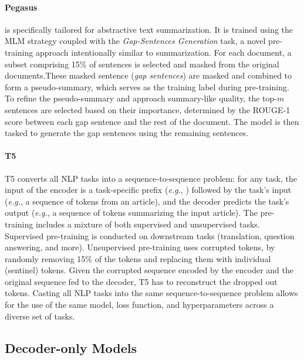 \paragraph{Pegasus} \citep{zhang2020pegasus} is specifically tailored for abstractive text summarization. It is trained using the \ac{MLM} strategy coupled with the \textit{Gap-Sentences Generation} task, a novel pre-training approach intentionally similar to summarization. For each document, a subset comprising 15\% of sentences is selected and masked from the original documents.These masked sentence (\textit{gap sentences}) are masked and combined to form a pseudo-summary, which serves as the training label during pre-training. To refine the pseudo-summary and approach summary-like quality, the top-$m$ sentences are selected based on their importance, determined by the \ac{ROUGE}-1 score between each gap sentence and the rest of the document. The model is then tasked to generate the gap sentences using the remaining sentences.


\paragraph{T5} \ac{T5} \citep{raffel2020exploring} converts all \ac{NLP} tasks into a sequence-to-sequence problem: for any task, the input of the encoder is a task-specific prefix (\textit{e.g.}, ) followed by the task's input (\textit{e.g.}, a sequence of tokens from an article), and the decoder predicts the task's output (\textit{e.g.}, a sequence of tokens summarizing the input article). The pre-training includes a mixture of both supervised and unsupervised tasks. Supervised pre-training is conducted on downstream tasks (translation, question answering, and more). Unsupervised pre-training uses corrupted tokens, by randomly removing 15\% of the tokens and replacing them with individual (sentinel) tokens. Given the corrupted sequence encoded by the encoder and the original sequence fed to the decoder, \ac{T5} has to reconstruct the dropped out tokens. Casting all \ac{NLP} tasks into the same sequence-to-sequence problem allows for the use of the same model, loss function, and hyperparameters across a diverse set of tasks. 

\subsection{Decoder-only Models}

